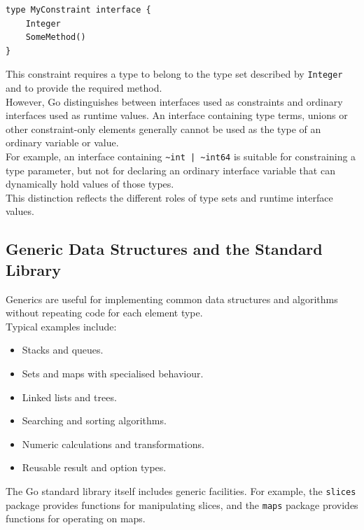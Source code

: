 \begin{lstlisting}
type MyConstraint interface {
    Integer
    SomeMethod()
}
\end{lstlisting}

This constraint requires a type to belong to the type set described by \texttt{Integer} and to provide the required method.\\

However, Go distinguishes between interfaces used as constraints and ordinary interfaces used as runtime values. An interface containing type terms, unions or other constraint-only elements generally cannot be used as the type of an ordinary variable or value.\\

For example, an interface containing \texttt{\~{}int | \~{}int64} is suitable for constraining a type parameter, but not for declaring an ordinary interface variable that can dynamically hold values of those types.\\

This distinction reflects the different roles of type sets and runtime interface values.\\

\subsection{Generic Data Structures and the Standard Library}

Generics are useful for implementing common data structures and algorithms without repeating code for each element type.\\

Typical examples include:

\begin{itemize}
    \item Stacks and queues.
    \item Sets and maps with specialised behaviour.
    \item Linked lists and trees.
    \item Searching and sorting algorithms.
    \item Numeric calculations and transformations.
    \item Reusable result and option types.
\end{itemize}

The Go standard library itself includes generic facilities. For example, the \texttt{slices} package provides functions for manipulating slices, and the \texttt{maps} package provides functions for operating on maps.\\

